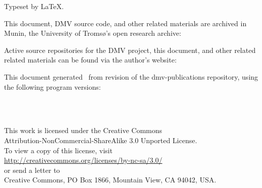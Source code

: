 
\clearpage
\vspace*{\fill}

Typeset by \LaTeX.

This document, \gls{DMV} source code, and other related materials are archived
in Munin, the University of Tromsø's open research archive: \\
\muninurl

Active source repositories for the \gls{DMV} project, this document, and other
related related materials can be found via the author's website: \\
\dmvurl

This document generated \GITAuthorDate\ from revision \GITAbrHash{} of the
dmv-publications repository, using the following program versions:

\engineversion \\
\graphvizversion \\
\gnuplotversion

This work is licensed under the Creative Commons \\
Attribution-NonCommercial-ShareAlike 3.0 Unported License. \\
To view a copy of this license, visit \\
\url{http://creativecommons.org/licenses/by-nc-sa/3.0/} \\
or send a letter to \\
Creative Commons, PO Box 1866, Mountain View, CA 94042, USA.
